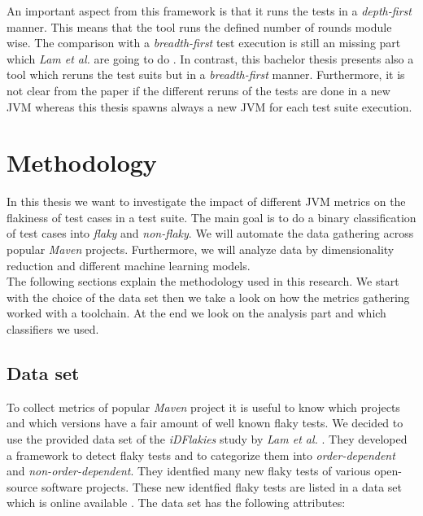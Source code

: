 \documentclass{seal_thesis}
\begin{document}
\noindent An important aspect from this framework is that it runs the tests in a \textit{depth-first} manner. This means that the tool runs the defined number of rounds module wise. The comparison with a \textit{breadth-first} test execution is still an missing part which \textit{Lam et al.} are going to do \cite{lam19}. In contrast, this bachelor thesis presents also a tool which reruns the test suits but in a \textit{breadth-first} manner. Furthermore, it is not clear from the paper if the different reruns of the tests are done in a new JVM whereas this thesis spawns always a new JVM for each test suite execution.




\chapter{Methodology} \label{methodology}
In this thesis we want to investigate the impact of different JVM metrics on the flakiness of test cases in a test suite. The main goal is to do a binary classification of test cases into \textit{flaky} and \textit{non-flaky}. We will automate the data gathering across popular \textit{Maven} projects. Furthermore, we will analyze data by dimensionality reduction and different machine learning models. \\

\noindent The following sections explain the methodology used in this research. We start with the choice of the data set then we take a look on how the metrics gathering worked with a toolchain. At the end we look on the analysis part and which classifiers we used. \\

\section{Data set} \label{sec:dataset}
To collect metrics of popular \textit{Maven} project it is useful to know which projects and which versions have a fair amount of well known flaky tests. We decided to use the provided data set of the \textit{iDFlakies} study by \textit{Lam et al.} \cite{lam19}. They developed a framework to detect flaky tests and to categorize them into \textit{order-dependent} and \textit{non-order-dependent}. They identfied many new flaky tests of various open-source software projects. These new identfied flaky tests are listed in a data set which is online available \cite{lam19:data}. The data set has the following attributes:
\end{document}
